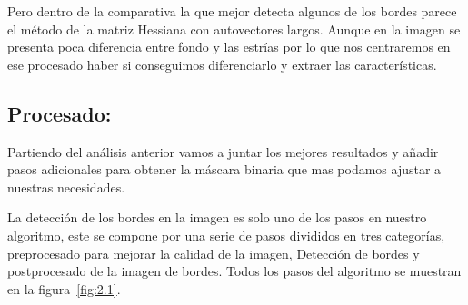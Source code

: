 Pero dentro de la comparativa la que mejor detecta algunos de los bordes parece el método de la matriz Hessiana con autovectores largos. Aunque en la imagen se presenta poca diferencia entre fondo y las estrías por lo que nos centraremos en ese procesado haber si conseguimos diferenciarlo y extraer las características.

\subsection{Procesado:}
Partiendo del análisis anterior vamos a juntar los mejores resultados y añadir pasos adicionales para obtener la máscara binaria que mas podamos ajustar a nuestras necesidades.

La detección de los bordes en la imagen es solo uno de los pasos en nuestro algoritmo, este se compone por una serie de pasos divididos en tres categorías, preprocesado para mejorar la calidad de la imagen, Detección de bordes y postprocesado de la imagen de bordes. Todos los pasos del algoritmo se muestran en la figura~\ref{fig:2.1}.

